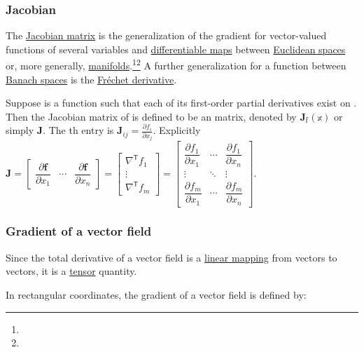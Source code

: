 \documentclass[
]{article}
\begin{document}
\hypertarget{jacobian}{%
\subsubsection{Jacobian}\label{jacobian}}

The \href{Jacobian_matrix}{Jacobian matrix} is the generalization of the
gradient for vector-valued functions of several variables and
\href{differentiable_map}{differentiable maps} between
\href{Euclidean_space}{Euclidean spaces} or, more generally,
\href{manifold}{manifolds}.\footnote{}\footnote{} A further
generalization for a function between \href{Banach_space}{Banach spaces}
is the \href{Fréchet_derivative}{Fréchet derivative}.

Suppose is a function such that each of its first-order partial
derivatives exist on . Then the Jacobian matrix of is defined to be an
matrix, denoted by \(\mathbf{J}_\mathbb{f}(\mathbb{x})\) or simply
\(\mathbf{J}\). The th entry is
\(\mathbf J_{ij} = \frac{\partial f_i}{\partial x_j}\). Explicitly
\(\mathbf J = \begin{bmatrix}
    \dfrac{\partial \mathbf{f}}{\partial x_1} & \cdots & \dfrac{\partial \mathbf{f}}{\partial x_n} \end{bmatrix}
= \begin{bmatrix}
    \nabla^\mathsf{T} f_1 \\  
    \vdots \\
    \nabla^\mathsf{T} f_m   
    \end{bmatrix}
= \begin{bmatrix}
    \dfrac{\partial f_1}{\partial x_1} & \cdots & \dfrac{\partial f_1}{\partial x_n}\\
    \vdots & \ddots & \vdots\\
    \dfrac{\partial f_m}{\partial x_1} & \cdots & \dfrac{\partial f_m}{\partial x_n} \end{bmatrix}.\)

\hypertarget{gradient_of_a_vector_field}{%
\subsubsection{Gradient of a vector
field}\label{gradient_of_a_vector_field}}

Since the total derivative of a vector field is a
\href{linear_mapping}{linear mapping} from vectors to vectors, it is a
\url{tensor} quantity.

In rectangular coordinates, the gradient of a vector field is defined
by:
\end{document}
